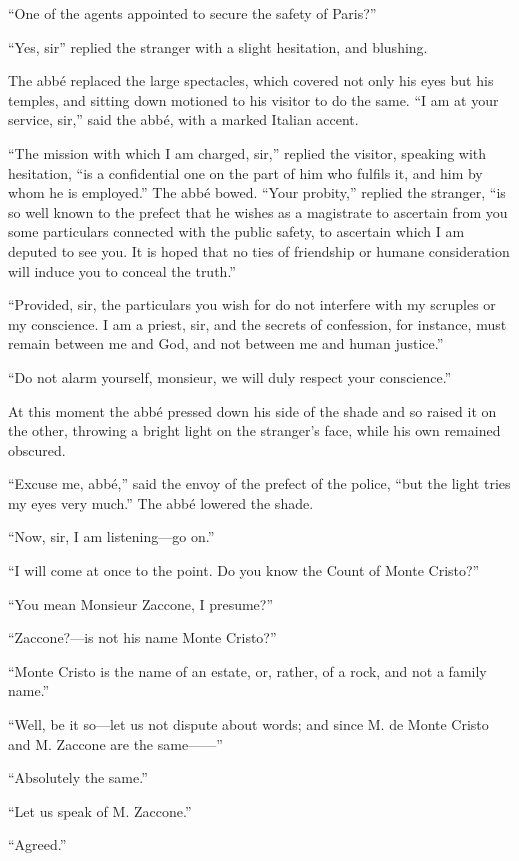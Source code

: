 “One of the agents appointed to secure the safety of Paris?”

“Yes, sir” replied the stranger with a slight hesitation, and blushing.

The abbé replaced the large spectacles, which covered not only his eyes
but his temples, and sitting down motioned to his visitor to do the
same. “I am at your service, sir,” said the abbé, with a marked Italian
accent.

“The mission with which I am charged, sir,” replied the visitor,
speaking with hesitation, “is a confidential one on the part of him who
fulfils it, and him by whom he is employed.” The abbé bowed. “Your
probity,” replied the stranger, “is so well known to the prefect that
he wishes as a magistrate to ascertain from you some particulars
connected with the public safety, to ascertain which I am deputed to
see you. It is hoped that no ties of friendship or humane consideration
will induce you to conceal the truth.”

“Provided, sir, the particulars you wish for do not interfere with my
scruples or my conscience. I am a priest, sir, and the secrets of
confession, for instance, must remain between me and God, and not
between me and human justice.”

“Do not alarm yourself, monsieur, we will duly respect your
conscience.”

At this moment the abbé pressed down his side of the shade and so
raised it on the other, throwing a bright light on the stranger’s face,
while his own remained obscured.

“Excuse me, abbé,” said the envoy of the prefect of the police, “but
the light tries my eyes very much.” The abbé lowered the shade.

“Now, sir, I am listening—go on.”

“I will come at once to the point. Do you know the Count of Monte
Cristo?”

“You mean Monsieur Zaccone, I presume?”

“Zaccone?—is not his name Monte Cristo?”

“Monte Cristo is the name of an estate, or, rather, of a rock, and not
a family name.”

“Well, be it so—let us not dispute about words; and since M. de Monte
Cristo and M. Zaccone are the same——”

“Absolutely the same.”

“Let us speak of M. Zaccone.”

“Agreed.”

